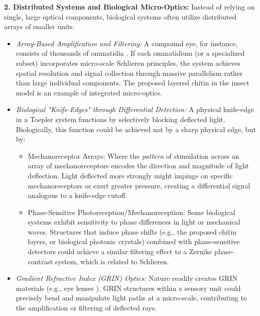 \documentclass[11pt]{article}
\begin{document}
\textbf{2. Distributed Systems and Biological Micro-Optics:}
Instead of relying on single, large optical components, biological systems often utilize distributed arrays of smaller units.
    \begin{itemize}
        \item \textit{Array-Based Amplification and Filtering:} A compound eye, for instance, consists of thousands of ommatidia \cite{Land2012AnimalEyes}. If each ommatidium (or a specialized subset) incorporates micro-scale Schlieren principles, the system achieves spatial resolution and signal collection through massive parallelism rather than large individual components. The proposed layered chitin in the insect model is an example of integrated micro-optics.
        \item \textit{Biological "Knife-Edges" through Differential Detection:} A physical knife-edge in a Toepler system functions by selectively blocking deflected light. Biologically, this function could be achieved not by a sharp physical edge, but by:
            \begin{itemize}
                \item Mechanoreceptor Arrays: Where the \textit{pattern} of stimulation across an array of mechanoreceptors encodes the direction and magnitude of light deflection. Light deflected more strongly might impinge on specific mechanoreceptors or exert greater pressure, creating a differential signal analogous to a knife-edge cutoff.
                \item Phase-Sensitive Photoreception/Mechanoreception: Some biological systems exhibit sensitivity to phase differences in light or mechanical waves. Structures that induce phase shifts (e.g., the proposed chitin layers, or biological photonic crystals) combined with phase-sensitive detectors could achieve a similar filtering effect to a Zernike phase-contrast system, which is related to Schlieren.
            \end{itemize}
        \item \textit{Gradient Refractive Index (GRIN) Optics:} Nature readily creates GRIN materials (e.g., eye lenses \cite{Land2012AnimalEyes}). GRIN structures within a sensory unit could precisely bend and manipulate light paths at a micro-scale, contributing to the amplification or filtering of deflected rays.
    \end{itemize}
\end{document}
